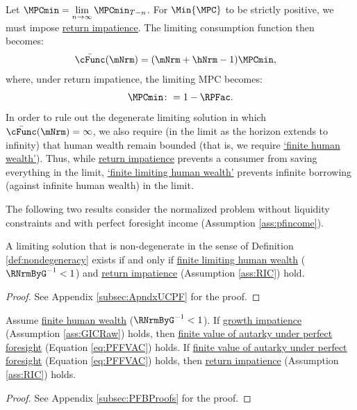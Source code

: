\documentclass[\econtexRoot/BufferStockTheory]{subfiles}
\begin{document}
Let $\MPCmin = \lim\limits_{n\rightarrow\infty}\MPCmin_{T-n}$.
For $\Min{\MPC}$ to be strictly positive, we must impose \hyperlink{RIC}{return impatience}.
The limiting consumption function then becomes:
%
\begin{equation}\begin{gathered}\begin{aligned}\label{eq:cFuncPFUnc}
  \bar{\cFunc}(\mNrm)  & = (\mNrm+\hNrm-1)\MPCmin,
\end{aligned}\end{gathered}\end{equation}
%
where, under return impatience, the limiting MPC becomes:
%
%
\begin{equation}\label{eq:MPCminDef}
\MPCmin \colon = 1-\RPFac.
\end{equation}
%
%
%
In order to rule out the degenerate limiting solution in which $\bar{\cFunc}(\mNrm) = \infty$, we also require (in the limit as the horizon extends to infinity) that human wealth remain bounded (that is, we require \hyperlink{FHWC}{`finite human wealth'}).
Thus, while \hyperlink{RIC}{return impatience} prevents a consumer from saving everything in the limit,  \hyperlink{FHWC}{`finite limiting  human wealth'} prevents infinite borrowing (against infinite human wealth) in the limit.

The following two results consider the normalized problem without liquidity constraints and with perfect foresight income (Assumption \ref{ass:pfincome}).

\begin{proposition}\label{prop:pfUCFHWC}
 A limiting solution that is non-degenerate in the sense of Definition \ref{def:nondegeneracy} exists if and only if \hyperlink{FHWC}{finite limiting  human wealth} ($\RNrmByG^{-1}<1$) and \hyperlink{RIC}{return impatience} (Assumption \ref{ass:RIC}) hold.
\end{proposition}
\begin{proof}\let\qed\relax
  See Appendix \ref{subsec:ApndxUCPF} for the proof.

\end{proof}
  

\begin{claim}\label{claim:PFConspC}
Assume \hyperlink{FHWC}{finite human wealth} ($\RNrmByG^{-1}<1$). If \hyperlink{GICRaw}{growth impatience} (Assumption \ref{ass:GICRaw}) holds, then \hyperlink{PFFVAC}{finite value of autarky under perfect foresight} (Equation \ref{eq:PFFVAC}) holds. If \hyperlink{PFFVAC}{finite value of autarky under perfect foresight} (Equation \ref{eq:PFFVAC}) holds, then \hyperlink{RIC}{return impatience} (Assumption \ref{ass:RIC}) holds. 
\end{claim}
\begin{proof}\let\qed\relax
See Appendix \ref{subsec:PFBProofs} for the proof.
\end{proof}
\end{document}
